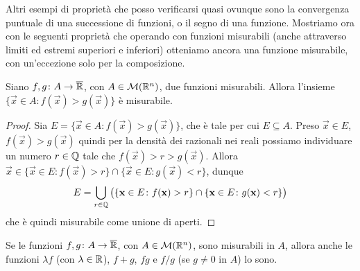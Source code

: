 Altri esempi di proprietà che posso verificarsi quasi ovunque sono la convergenza puntuale di una successione di funzioni, o il segno di una funzione.
Mostriamo ora con le seguenti proprietà che operando con funzioni misurabili (anche attraverso limiti ed estremi superiori e inferiori) otteniamo ancora una funzione misurabile, con un'eccezione solo per la composizione.
\begin{lemma}
	Siano $f,g\colon A\to\overline{\mathbb{R}}$, con $A\in\mathcal M(\mathbb{R}^n)$, due funzioni misurabili.
	Allora l'insieme $\{\vec x\in A\colon f(\vec x)>g(\vec x)\}$ è misurabile.
\end{lemma}
\begin{proof}
	Sia $E=\{\vec x\in A\colon f(\vec x)>g(\vec x)\}$, che è tale per cui $E\subseteq A$.
	Preso $\vec x\in E$, $f(\vec x)>g(\vec x)$ quindi per la densità dei razionali nei reali possiamo individuare un numero $r\in\mathbb{Q}$ tale che $f(\vec x)>r>g(\vec x)$.
	Allora $\vec x\in\{\vec x\in E\colon f(\vec x)>r\}\cap\{\vec x\in E\colon g(\vec x)<r\}$, dunque
	\begin{equation}
		E=\bigcup_{r\in\mathbb{Q}}\big(\{\mathbf{x}\in E\colon f(\mathbf{x})>r\}\cap\{\mathbf{x}\in E\colon g(\mathbf{x})<r\}\big)
	\end{equation}
	che è quindi misurabile come unione di aperti.
\end{proof}
\begin{proprieta} \label{pr:operazioni-funzioni-misurabili}
	Se le funzioni $f,g\colon A\to\overline{\mathbb{R}}$, con $A\in\mathcal M(\mathbb{R}^n)$, sono misurabili in $A$, allora anche le funzioni $\lambda f$ (con $\lambda\in\mathbb{R}$), $f+g$, $fg$ e $f/g$ (se $g\neq0$ in $A$) lo sono.
\end{proprieta}
